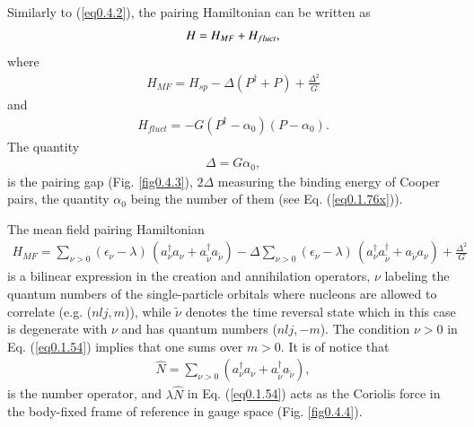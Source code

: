   
   Similarly to  (\ref{eq0.4.2}), the pairing Hamiltonian can be written as  
\begin{align}\label{eq0.1.50}
H=H_{MF}+H_{fluct}, \idx{Fluctuations (symmetry restoration)}
\end{align}
where 
\begin{align}\label{eq0.1.51}
H_{MF}=H_{sp}-\Delta(P^\dagger+P)+\frac{\Delta^2}{G}
\end{align}
and
\begin{align}\label{eq0.1.52}
H_{fluct}=-G(P^\dagger-\alpha_0)(P-\alpha_0).
\end{align}
The quantity 
\begin{align}\label{eq0.1.53}
\Delta=G\alpha_0,
\end{align}
is the pairing gap (Fig. \ref{fig0.4.3}), $2\Delta$ measuring the binding energy 
 of Cooper pairs, the quantity $\alpha_0$ being the number of them 
  (see Eq. (\ref{eq0.1.76x})).

 The mean field pairing Hamiltonian 
\begin{align}\label{eq0.1.54}
H_{MF}=\sum_{\nu>0}(\epsilon_\nu-\lambda)\,(a^\dagger_\nu a_\nu+a^\dagger_{\tilde\nu} a_{\tilde\nu})-\Delta\sum_{\nu>0}(\epsilon_\nu-\lambda)\,(a^\dagger_\nu a^\dagger_{\tilde\nu}+a_{\tilde\nu} a_{\nu})+\frac{\Delta^2}{G}
\end{align}
is a bilinear expression in the creation and annihilation operators, $\nu$ labeling the quantum numbers of the single-particle orbitals where nucleons are allowed to correlate (e.g. ($nlj,m$)), while $\tilde \nu$ denotes the time reversal state which in this case is degenerate with $\nu$ and has quantum numbers ($nlj,-m$). The condition $\nu>0$ in Eq. (\ref{eq0.1.54}) implies that one sums over $m>0$. It is of notice that 
\begin{align}\label{eq0.1.55}
\hat N=\sum_{\nu>0}(a^\dagger_\nu a_\nu+a^\dagger_{\tilde\nu} a_{\tilde\nu}),
\end{align}
is the number operator, and $\lambda \hat N$ in Eq. (\ref{eq0.1.54}) acts as the Coriolis force in the body-fixed frame of reference  in gauge space (Fig. \ref{fig0.4.4}).  

